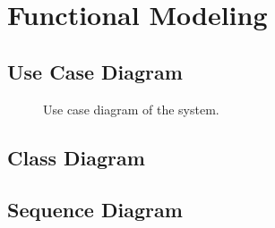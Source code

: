 \section{Functional Modeling}

\lipsum[1]

\subsection{Use Case Diagram}

\lipsum[2]

\begin{figure}[H]
	\centering
	\caption{Use case diagram of the system.}
	\label{fig:usecase}
\end{figure}

\subsection{Class Diagram}

\lipsum[3]

\subsection{Sequence Diagram}

\lipsum[4]
